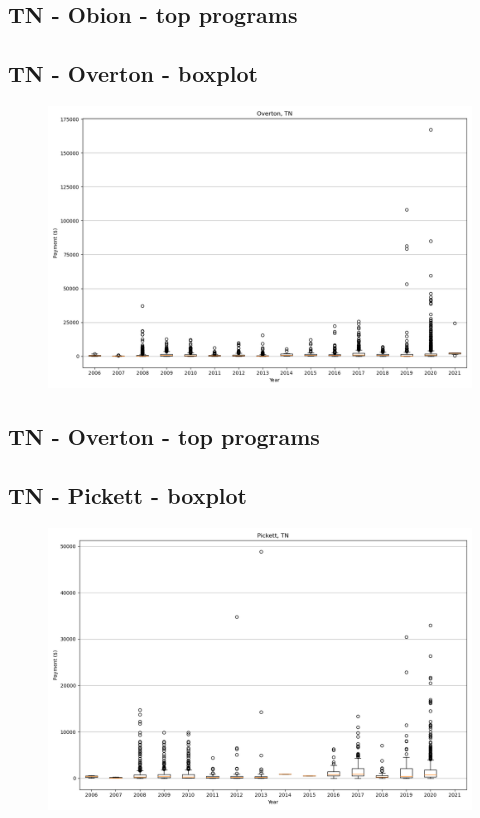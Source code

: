 \subsection*{TN - Obion - top programs}

\newpage
\subsection*{TN - Overton - boxplot}
\begin{figure}[h]
\centering
\includegraphics[width=7in]{../output/boxplots/counties/Overton-TN_boxplot.png}
\end{figure}


\subsection*{TN - Overton - top programs}

\newpage
\subsection*{TN - Pickett - boxplot}
\begin{figure}[h]
\centering
\includegraphics[width=7in]{../output/boxplots/counties/Pickett-TN_boxplot.png}
\end{figure}


